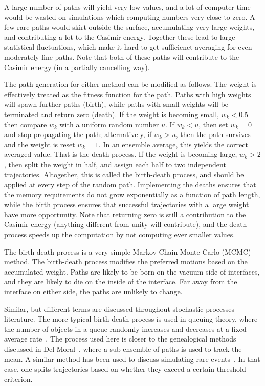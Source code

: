 A large number of paths will yield very low values, and a lot of computer time would be wasted on simulations
which computing numbers very close to zero.  A few rare paths would skirt outside the surface, accumulating
very large weights, and contributing a lot to the Casimir energy.  Together these lead to large statistical
fluctuations, which make it hard to get sufficienct averaging for even moderately fine paths.
Note that both of these paths will contribute to the Casimir energy (in a partially cancelling way).

The path generation for either method can be modified as follows.  The weight is effectively treated as 
the fitness function for the path.  Paths with high weights will spawn further paths (birth), while paths with
small weights will be terminated and return zero (death).
If the weight is becoming small, $w_k<0.5$ then compare $w_k$ with a uniform random number $u$.
If $w_k<u$, then set $w_k=0$ and stop propagating the path; alternatively, if $w_k>u$, then 
the path survives and the weight is reset $w_k=1$.    In an ensemble average, this yields the correct averaged value.  
That is the death process.
If the weight is becoming large, $w_k>2$, then split the weight in half, and assign each half to 
two independent trajectories.
Altogether, this is called the birth-death process, and should be applied at every step of the random path.
Implementing the deaths ensures that the memory requirements do not grow exponentially as a function 
of path length, while the birth process ensures that successful trajectories with a large weight have 
more opportunity.  Note that returning zero is still a contribution to the Casimir energy (anything different
from unity will contribute), and the death process speeds up the computation by not computing ever smaller
values.

The birth-death process is a very simple Markov Chain Monte Carlo (MCMC) method.  The birth-death
process modifies the preferred motions based on the accumulated weight.  Paths are likely to be born
on the vacuum side of interfaces, and they are likely to die on the inside of the interface.
Far away from the interface on either side, the paths are unlikely to change.  

Similar, but different terms are discussed throughout
stochastic processes literature.  The more typical birth-death process is used in queuing theory, where 
the number of objects in a queue randomly increases and decreases at a fixed average rate~\cite{}.
The process used here is closer to the genealogical methods discussed in Del Moral~\cite{DelMoral2004},
where a sub-ensemble of paths is used to track the mean.
A similar method has been used to discuss simulating rare events~\cite{}.  In that case, one splits trajectories 
based on whether they exceed a certain threshold criterion. 

